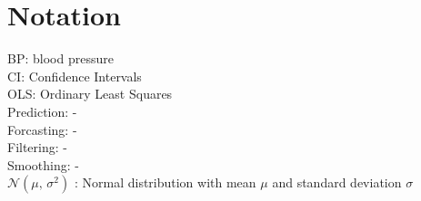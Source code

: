 \chapter*{Notation}
\label{c:Notation}

BP: blood pressure \\
CI: Confidence Intervals\\
OLS: Ordinary Least Squares \\
Prediction: - \\
Forcasting: - \\
Filtering: - \\
Smoothing: - \\

$\mathcal{N}(\mu,\,\sigma^{2})$ : Normal distribution with mean $\mu$ and standard deviation $\sigma$



